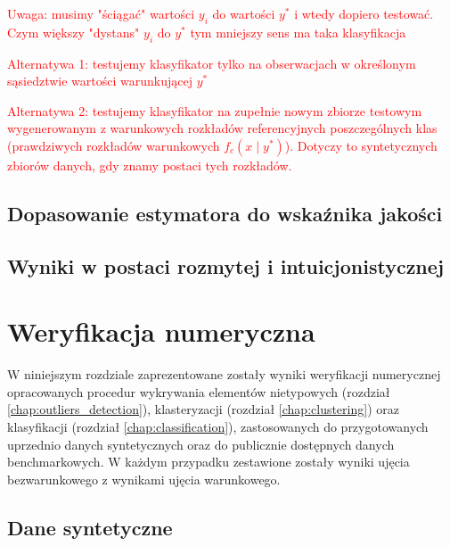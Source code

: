 \documentclass[12pt,a4paper,oneside]{book}
\theoremstyle{definition}
\begin{document}
\textcolor{red}{Uwaga: musimy "ściągać" wartości $y_i$ do wartości $y^*$ i wtedy dopiero testować. Czym większy "dystans" $y_i$ do $y^*$ tym mniejszy sens ma taka klasyfikacja}

\textcolor{red}{Alternatywa 1: testujemy klasyfikator tylko na obserwacjach w określonym sąsiedztwie wartości warunkującej $y^*$}

\textcolor{red}{Alternatywa 2: testujemy klasyfikator na zupełnie nowym zbiorze testowym wygenerowanym z warunkowych rozkładów referencyjnych poszczególnych klas (prawdziwych rozkładów warunkowych $f_c(x \mid y^*)$). Dotyczy to syntetycznych zbiorów danych, gdy znamy postaci tych rozkładów.}

\section{Dopasowanie estymatora do wskaźnika jakości}

\section{Wyniki w postaci rozmytej i intuicjonistycznej}

\chapter{Weryfikacja numeryczna}

W niniejszym rozdziale zaprezentowane zostały wyniki weryfikacji numerycznej opracowanych procedur wykrywania elementów nietypowych (rozdział \ref{chap:outliers_detection}), klasteryzacji (rozdział \ref{chap:clustering}) oraz klasyfikacji (rozdział \ref{chap:classification}), zastosowanych do przygotowanych uprzednio danych syntetycznych oraz do publicznie dostępnych danych benchmarkowych. W każdym przypadku zestawione zostały wyniki ujęcia bezwarunkowego z wynikami ujęcia warunkowego.

\section{Dane syntetyczne}
\end{document}
